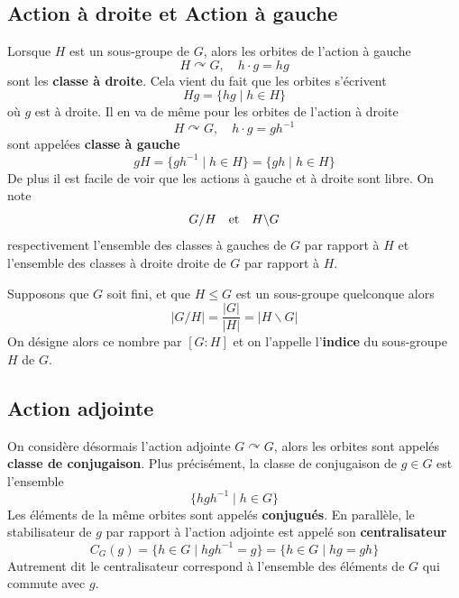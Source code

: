 \subsection{Action à droite et Action à gauche}
\begin{definition}
	Lorsque $H$ est un sous-groupe de $G$, alors les orbites de l'action à gauche
	\[
	H \curvearrowright G, \quad h \cdot g = hg
	\]
	sont les \textbf{classe à droite}. Cela vient du fait que les orbites s'écrivent
	\[
	Hg = \{hg \mid h \in H\}
	\]
	où $g$ est à droite. Il en va de même pour les orbites de l'action à droite
	\[
	H \curvearrowright G, \quad h \cdot g = g h^{-1}
	\]
	sont appelées \textbf{classe à gauche}
	\[
	g H = \{gh^{-1} \mid h \in H\} = \{ g h \mid h \in H\}
	\]De plus il est facile de voir que les actions à gauche et à droite sont libre. 	
	On note
	\[
	G / H \quad \text{et} \quad H \backslash G
	\]
	respectivement l'ensemble des classes à gauches de $G$ par rapport à $H$ et l'ensemble des classes à droite droite de $G$ par rapport à $H$.
\end{definition}

\begin{proposition}
	Supposons que $G$ soit fini, et que $H \leq G$ est un sous-groupe quelconque alors
	\[
	|G / H| =  \frac{|G|}{|H|} = |H \backslash G|
	\]
	On désigne alors ce nombre par $[G : H]$ et on l'appelle l'\textbf{indice} du sous-groupe $H$ de $G$.
\end{proposition}

\subsection{Action adjointe}
\begin{definition}
	On considère désormais l'action adjointe $G \curvearrowright G$, alors les orbites sont appelés \textbf{classe de conjugaison}. Plus précisément, la classe de conjugaison de $g \in G$ est l'ensemble
	\[
	\{h g h^{-1} \mid h \in G\}
	\]
	Les éléments de la même orbites sont appelés \textbf{conjugués}. En parallèle, le stabilisateur de $g$ par rapport à l'action adjointe est appelé son \textbf{centralisateur}
	\[
	C_G(g) = \{h \in G \mid h g h^{-1} = g\} = \{	h \in G \mid hg = gh\}
	\]
	Autrement dit le centralisateur correspond à l'ensemble des éléments de $G$ qui commute avec $g$.
\end{definition}

